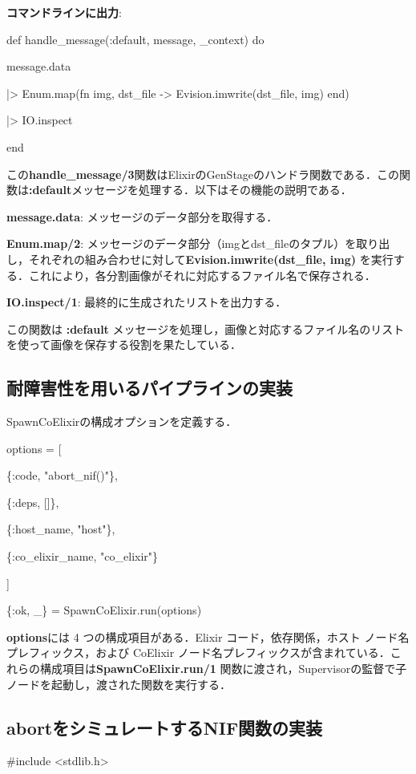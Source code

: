 \documentclass[a4paper]{jreport}	%
\begin{document}
\textbf{コマンドラインに出力}:

  def handle\_message(:default, message, \_context) do
  
    message.data
    
    |> Enum.map(fn {img, dst\_file} -> Evision.imwrite(dst\_file, img) end)
    
    |> IO.inspect
    
  end

この\textbf{handle\_message/3}関数はElixirのGenStageのハンドラ関数である．この関数は\textbf{:default}メッセージを処理する．以下はその機能の説明である．

\textbf{message.data}: メッセージのデータ部分を取得する．

\textbf{Enum.map/2}: メッセージのデータ部分（imgとdst\_fileのタプル）を取り出し，それぞれの組み合わせに対して\textbf{Evision.imwrite(dst\_file, img)} を実行する．これにより，各分割画像がそれに対応するファイル名で保存される．

\textbf{IO.inspect/1}: 最終的に生成されたリストを出力する．

この関数は \textbf{:default} メッセージを処理し，画像と対応するファイル名のリストを使って画像を保存する役割を果たしている．

\subsection{耐障害性を用いるパイプラインの実装}
SpawnCoElixirの構成オプションを定義する．

options = [

\{:code, "abort\_nif()"\},

\{:deps, []\},

\{:host\_name, "host"\},

\{:co\_elixir\_name, "co\_elixir"\}

]

\{:ok, \_\} = SpawnCoElixir.run(options)

\textbf{options}には 4 つの構成項目がある．Elixir コード，依存関係，ホスト ノード名プレフィックス，および CoElixir ノード名プレフィックスが含まれている．これらの構成項目は\textbf{SpawnCoElixir.run/1} 関数に渡され，Supervisorの監督で子ノードを起動し，渡された関数を実行する．

\subsection{abortをシミュレートするNIF関数の実装}

\#include <stdlib.h>
\end{document}
